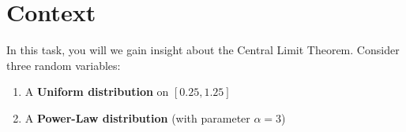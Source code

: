 \section*{Context}

In this task, you will we gain insight about the Central Limit Theorem. Consider three random variables:

\begin{enumerate}
    \item[(a)] A \textbf{Uniform distribution} on $[0.25,1.25]$
    \item[(b)] A \textbf{Power-Law distribution} (with parameter $\alpha = 3$)
\end{enumerate}

\newpage
